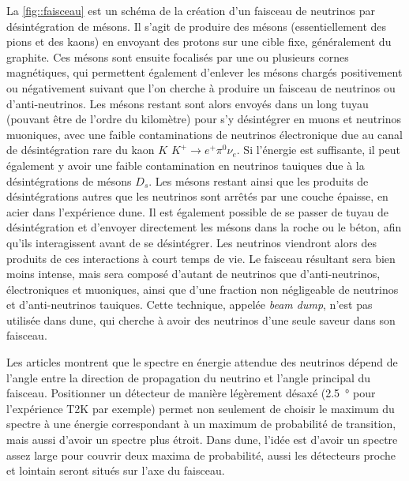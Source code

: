 	         La \autoref{fig::faisceau} est un schéma de la création d'un faisceau de neutrinos par désintégration de mésons. Il s'agit de produire des mésons (essentiellement des pions et des kaons) en envoyant des protons sur une cible fixe, généralement du graphite. Ces mésons sont ensuite focalisés par une ou plusieurs cornes magnétiques, qui permettent également d'enlever les mésons chargés positivement ou négativement suivant que l'on cherche à produire un faisceau de neutrinos ou d'anti-neutrinos. Les mésons restant sont alors envoyés dans un long tuyau (pouvant être de l'ordre du kilomètre) pour s'y désintégrer en muons et neutrinos muoniques, avec une faible contaminations de neutrinos électronique due au canal de désintégration rare du kaon $K$ $K^+ \to e^+ \pi^0 \nu_e$. Si l'énergie est suffisante, il peut également y avoir une faible contamination en neutrinos tauiques due à la désintégrations de mésons $D_s$. Les mésons restant ainsi que les produits de désintégrations autres que les neutrinos sont arrêtés par une couche épaisse, en acier dans l'expérience \gls{dune}. Il est également possible de se passer de tuyau de désintégration et d'envoyer directement les mésons dans la roche ou le béton, afin qu'ils interagissent avant de se désintégrer. Les neutrinos viendront alors des produits de ces interactions à court temps de vie. Le faisceau résultant sera bien moins intense, mais sera composé d'autant de neutrinos que d'anti-neutrinos, électroniques et muoniques, ainsi que d'une fraction non négligeable de neutrinos et d'anti-neutrinos tauiques. Cette technique, appelée \textit{beam dump}, n'est pas utilisée dans \gls{dune}, qui cherche à avoir des neutrinos d'une seule saveur dans son faisceau.
	         
	         Les articles \cite{Levy2010,McDonald2001,Itow2001} montrent que le spectre en énergie attendue des neutrinos dépend de l'angle entre la direction de propagation du neutrino et l'angle principal du faisceau. Positionner un détecteur de manière légèrement désaxé (\SI{2.5}{\degree} pour l'expérience T2K par exemple) permet non seulement de choisir le maximum du spectre à une énergie correspondant à un maximum de probabilité de transition, mais aussi d'avoir un spectre plus étroit. Dans \gls{dune}, l'idée est d'avoir un spectre assez large pour couvrir deux maxima de probabilité, aussi les détecteurs proche et lointain seront situés sur l'axe du faisceau.
	            
